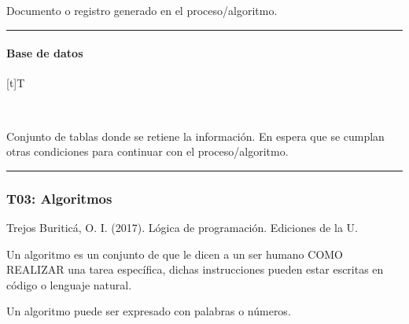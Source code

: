 \documentclass[letterpaper,10pt,spanish]{sphinxmanual}
\let\sphinxpxdimen\pdfpxdimen\else\newdimen\sphinxpxdimen
\begin{document}
\sphinxAtStartPar
Documento o registro generado en el proceso/algoritmo.


\bigskip\hrule\bigskip



\paragraph{Base de datos}
\label{\detokenize{cursos/ofimatica11/recursos/T02:base-de-datos}}

\begin{savenotes}\sphinxattablestart
\sphinxthistablewithglobalstyle
\centering
\begin{tabulary}{\linewidth}[t]{T}
\sphinxtoprule
\sphinxtableatstartofbodyhook

\begin{sphinxfigure-in-table}
\centering
\capstart
\noindent\sphinxincludegraphics[width=120\sphinxpxdimen]{{image082}.png}
\label{\detokenize{cursos/ofimatica11/recursos/T02:id10}}\end{sphinxfigure-in-table}\relax
\\
\sphinxbottomrule
\end{tabulary}
\sphinxtableafterendhook\par
\sphinxattableend\end{savenotes}

\sphinxAtStartPar
Conjunto de tablas donde se retiene la información. En espera que se cumplan otras condiciones para continuar con el proceso/algoritmo.


\bigskip\hrule\bigskip


\sphinxstepscope


\subsubsection{T03: Algoritmos}
\label{\detokenize{cursos/ofimatica11/recursos/T03:t03-algoritmos}}\label{\detokenize{cursos/ofimatica11/recursos/T03::doc}}
\sphinxAtStartPar
%
\begin{footnote}[1]\sphinxAtStartFootnote
Trejos Buriticá, O. I. (2017). Lógica de programación. Ediciones de la U.
%
\end{footnote} Un algoritmo es un conjunto de  que le dicen a un ser humano COMO REALIZAR una tarea específica, dichas instrucciones pueden estar escritas en código o lenguaje natural.

\sphinxAtStartPar
Un algoritmo puede ser expresado con palabras o números.
\end{document}
